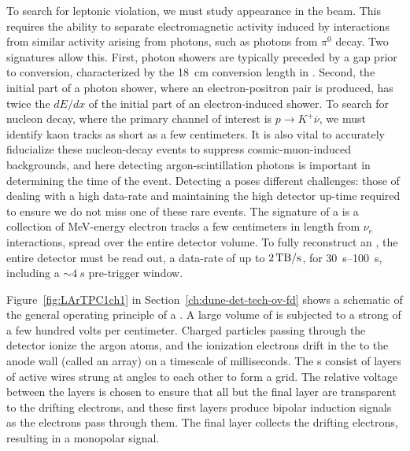 To search for leptonic  violation, we must study \nue appearance in the  \numu beam. This requires the ability to separate electromagnetic activity induced by  \nue interactions from similar activity arising from photons, such as photons from $\pi^{0}$ decay. Two signatures allow this. First, photon showers are typically preceded by a gap prior to conversion, characterized by the \SI{18}{cm} conversion length in . Second, the initial part of a photon shower, where an electron-positron pair is produced, has twice the $dE/dx$ of the initial part of an electron-induced shower. To search for nucleon decay, where the primary channel of interest is $p\rightarrow K^{+}\overline{\nu}$, we must identify kaon tracks as short as a few centimeters. It is also vital to accurately fiducialize these nucleon-decay events to suppress cosmic-muon-induced backgrounds, and here detecting argon-scintillation photons is important in determining the time of the event. Detecting a  poses different challenges: those of dealing with a high data-rate and maintaining the high detector up-time required to ensure we do not miss one of these rare events. The signature of a  is a collection of MeV-energy electron tracks a few centimeters in length from  $\nu_{e}$ interactions, spread over the entire detector volume. To fully reconstruct an , the entire detector must be read out, a data-rate of up to $\SI{2}{\tera\byte/\second}$, for \SIrange{30}{100}{s}, including a $\sim\!\SI{4}{s}$ pre-trigger window.



Figure~\ref{fig:LArTPC1ch1} in Section~\ref{ch:dune-det-tech-ov-fd} shows a schematic of the general operating principle of a  . A large volume of  is subjected to a strong \efield of a few hundred volts per centimeter. Charged particles passing through the detector ionize the argon atoms, and the ionization electrons drift in the \efield to the anode wall (called an  array) on a timescale of milliseconds. 
The  s consist of layers of active wires strung at angles to each other to form a grid. The relative voltage between the layers is chosen to ensure that all but the final layer are transparent to the drifting electrons, and these first layers produce bipolar induction signals as the electrons pass through them. The final layer collects the drifting electrons, resulting in a monopolar signal.

